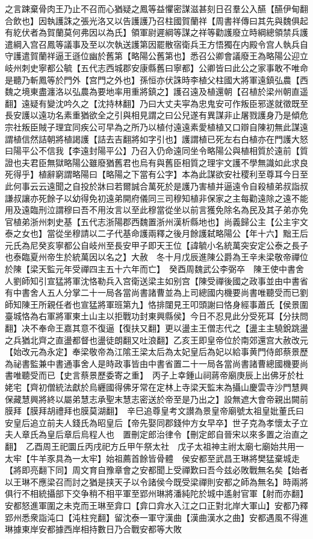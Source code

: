 之言踈棄骨肉王乃止不召而心猶疑之鳳等益懼密謀滋甚刻日召羣公入醼【醼伊甸翻合飲也】因執護誅之張光洛又以告護護乃召柱國賀蘭祥【周書祥傳曰其先與魏俱起有紇伏者為賀蘭莫何弗因以為氏】領軍尉遲綱等謀之祥等勸護廢立時綱總領禁兵護遣綱入宫召鳳等議事及至以次執送護第因罷散宿衛兵王方悟獨在内殿令宫人執兵自守護遣賀蘭祥逼王遜位幽於舊第【略陽公舊第也】悉召公卿會議廢王為略陽公迎立岐州刺史寧都公毓【五代志西城郡安康縣舊曰寧都】公卿皆曰此公之家事敢不唯命是聽乃斬鳳等於門外【宫門之外也】孫恒亦伏誅時李植父柱國大將軍遠鎮弘農【西魏之境東盡瀍洛以弘農為要地率用重將鎮之】護召遠及植還朝【召植於梁州朝直遥翻】遠疑有變沈吟久之【沈持林翻】乃曰大丈夫寜為忠鬼安可作叛臣邪遂就徵既至長安護以遠功名素重猶欲全之引與相見謂之曰公兒遂有異謀非止屠戮護身乃是傾危宗社叛臣賊子理宜同疾公可早為之所乃以植付遠遠素愛植植又口辯自陳初無此謀遠謂植信然詰朝將植謁護【詰去吉翻將如字引也】護謂植已死左右白植亦在門護大怒曰陽平公不信我【李遠封陽平公】乃召入仍命遠同坐令略陽公與植相質於遠前【質證也夫君臣無獄略陽公雖廢猶舊君也烏有與舊臣相質之理宇文護不學無識如此求良死得乎】植辭窮謂略陽曰【略陽之下當有公字】本為此謀欲安社稷利至尊耳今日至此何事云云遠聞之自投於牀曰若爾誠合萬死於是護乃害植并逼遠令自殺植弟叔詣叔謙叔讓亦死餘子以幼得免初遠弟開府儀同三司穆知植非保家之主每勸遠除之遠不能用及遠臨刑泣謂穆曰吾不用汝言以至此穆當從坐以前言獲免除名為民及其子弟亦免官植弟浙州刺史基【五代志浙陽郡西魏置浙州漢析縣地也】尚義歸公主【公主宇文泰之女也】當從坐穆請以二子代基命護兩釋之後月餘護弑略陽公【年十六】黜王后元氏為尼癸亥寧都公自岐州至長安甲子即天王位【諱毓小名統萬突安定公泰之長子也泰臨夏州帝生於統萬因以名之】大赦　冬十月戊辰進陳公爵為王辛未梁敬帝禪位於陳【梁天監元年受禪四主五十六年而亡】　癸酉周魏武公李弼卒　陳王使中書舍人劉師知引宣猛將軍沈恪勒兵入宫衛送梁主如别宫【陳受禪後國之政事並由中書省有中書舍人五人分掌二十一局各當尚書諸曹並為上司總國内機要尚書唯聽受而已劉師知陳王所親任者也宣猛將軍班第九】恪排闥見王叩頭謝曰恪身經事蕭氏【侯景圍臺城恪為右軍將軍東土山主以拒戰功封東興縣侯】今日不忍見此分受死耳【分扶問翻】决不奉命王嘉其意不復逼【復扶又翻】更以盪主王僧志代之【盪主主驍銳跳盪之兵猶北齊之直盪都督也盪徒朗翻又吐浪翻】乙亥王即皇帝位於南郊還宫大赦改元【始改元為永定】奉梁敬帝為江隂王梁太后為太妃皇后為妃以給事黄門侍郎蔡景歷為祕書監兼中書通事舍人是時政事皆由中書省置二十一局各當尚書諸曹總國機要尚書唯聽受而已【史言蔡景歷委寄之重】　丙子上幸鍾山祠蔣帝廟庚辰上出佛牙於杜姥宅【齊初僧統法獻於烏纒國得佛牙常在定林上寺梁天監末為攝山慶雲寺沙門慧興保藏慧興將終以屬弟慧志承聖末慧志密送於帝至是乃出之】設無遮大會帝親出闕前膜拜【膜拜胡禮拜也膜莫湖翻】　辛巳追尊皇考文讃為景皇帝廟號太祖皇妣董氏曰安皇后追立前夫人錢氏為昭皇后【帝先娶同郡錢仲方女早卒】世子克為孝懷太子立夫人章氏為皇后章后烏程人也　置刪定郎治律令【刪定郎自晉宋以來多置之治直之翻】　乙酉周王祀圜丘丙戌祀方丘甲午祭太社　戊子太祖神主祔太廟七廟始共用一太牢【牛羊豕具為一太牢】始祖薦首餘皆骨體　侯安都至武昌王琳將樊猛棄城走【將即亮翻下同】周文育自豫章會之安都聞上受禪歎曰吾今兹必敗戰無名矣【始者以王琳不應梁召而討之猶是挟天子以令諸侯今既受梁禪則安都之師為無名】時兩將俱行不相統攝部下交争稍不相平軍至郢州琳將潘純陀於城中遙射官軍【射而亦翻】安都怒進軍圍之未克而王琳至弇口【弇口弇水入江之口正對北岸大軍山】安都乃釋郢州悉衆詣沌口【沌柱兖翻】留沈泰一軍守漢曲【漢曲漢水之曲】安都遇風不得進琳據東岸安都據西岸相持數日乃合戰安都等大敗　